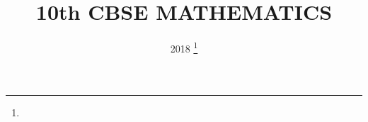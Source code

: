 \documentclass[journal,12pt,twocolumn]{IEEEtran}
\DeclareMathOperator*{\Res}{Res}
\begin{document}
\newtheorem{theorem}{Theorem}[section]
\newtheorem{problem}{Problem}
\newtheorem{proposition}{Proposition}[section]
\newtheorem{lemma}{Lemma}[section]
\newtheorem{corollary}[theorem]{Corollary}
\newtheorem{example}{Example}[section]
\newtheorem{definition}[problem]{Definition}
\newcommand{\BEQA}{\begin{eqnarray}}
\newcommand{\EEQA}{\end{eqnarray}}
\newcommand{\define}{\stackrel{\triangle}{=}}

\providecommand{\mbf}{\mathbf}
\providecommand{\pr}[1]{\ensuremath{\Pr\left(#1\right)}}
\providecommand{\qfunc}[1]{\ensuremath{Q\left(#1\right)}}
\providecommand{\sbrak}[1]{\ensuremath{{}\left[#1\right]}}
\providecommand{\lsbrak}[1]{\ensuremath{{}\left[#1\right.}}
\providecommand{\rsbrak}[1]{\ensuremath{{}\left.#1\right]}}
\providecommand{\brak}[1]{\ensuremath{\left(#1\right)}}
\providecommand{\lbrak}[1]{\ensuremath{\left(#1\right.}}
\providecommand{\rbrak}[1]{\ensuremath{\left.#1\right)}}
\providecommand{\cbrak}[1]{\ensuremath{\left\{#1\right\}}}
\providecommand{\lcbrak}[1]{\ensuremath{\left\{#1\right.}}
\providecommand{\rcbrak}[1]{\ensuremath{\left.#1\right\}}}
\theoremstyle{remark}
\newtheorem{rem}{Remark}
\newcommand{\sgn}{\mathop{\mathrm{sgn}}}
\providecommand{\abs}[1]{\left\vert#1\right\vert}
\providecommand{\res}[1]{\Res\displaylimits_{#1}} 
\providecommand{\norm}[1]{\left\lVert#1\right\rVert}
\providecommand{\mtx}[1]{\mathbf{#1}}
\providecommand{\mean}[1]{E\left[ #1 \right]}
\providecommand{\fourier}{\overset{\mathcal{F}}{ \rightleftharpoons}}
\providecommand{\system}{\overset{\mathcal{H}}{ \longleftrightarrow}}
\newcommand{\solution}{\noindent \textbf{Solution: }}
\newcommand{\cosec}{\,\text{cosec}\,}
\providecommand{\dec}[2]{\ensuremath{\overset{#1}{\underset{#2}{\gtrless}}}}
\newcommand{\myvec}[1]{\ensuremath{\begin{pmatrix}#1\end{pmatrix}}}
\newcommand{\mydet}[1]{\ensuremath{\begin{vmatrix}#1\end{vmatrix}}}
\makeatletter
{}
\makeatother
\let\StandardTheFigure\thefigure
\let\vec\mathbf
\renewcommand{\thefigure}{\theproblem}
\def\putbox#1#2#3{\makebox[0in][l]{\makebox[#1][l]{}\raisebox{\baselineskip}[0in][0in]{\raisebox{#2}[0in][0in]{#3}}}}
     \def\rightbox#1{\makebox[0in][r]{#1}}
     \def\centbox#1{\makebox[0in]{#1}}
     \def\topbox#1{\raisebox{-\baselineskip}[0in][0in]{#1}}
     \def\midbox#1{\raisebox{-0.5\baselineskip}[0in][0in]{#1}}
\vspace{3cm}
\title{
	10th CBSE MATHEMATICS
}
\author{ 2018
	\thanks{}
	
}
\maketitle
\newpage
\bigskip
\renewcommand{\thefigure}{\theenumi}
\renewcommand{\thetable}{\theenumi}
\end{document}
